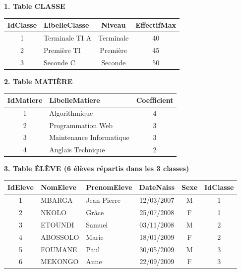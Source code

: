 \documentclass[11pt]{article}
\begin{document}
\begin{exemplebox}
\textbf{1. Table CLASSE}
\begin{center}
\begin{tabularx}{\linewidth}{|c|X|c|c|}\hline
\textbf{IdClasse} & \textbf{LibelleClasse} & \textbf{Niveau} & \textbf{EffectifMax} \\\hline
1 & Terminale TI A & Terminale & 40 \\\hline
2 & Première TI & Première & 45 \\\hline
3 & Seconde C & Seconde & 50 \\\hline
\end{tabularx}
\end{center}

\textbf{2. Table MATIÈRE}
\begin{center}
\begin{tabularx}{\linewidth}{|c|X|c|}\hline
\textbf{IdMatiere} & \textbf{LibelleMatiere} & \textbf{Coefficient} \\\hline
1 & Algorithmique & 4 \\\hline
2 & Programmation Web & 3 \\\hline
3 & Maintenance Informatique & 3 \\\hline
4 & Anglais Technique & 2 \\\hline
\end{tabularx}
\end{center}

\textbf{3. Table ÉLÈVE (6 élèves répartis dans les 3 classes)}
\begin{center}
\begin{tabularx}{\linewidth}{|c|X|X|c|c|c|}\hline
\textbf{IdEleve} & \textbf{NomEleve} & \textbf{PrenomEleve} & \textbf{DateNaiss} & \textbf{Sexe} & \textbf{IdClasse} \\\hline
1 & MBARGA & Jean-Pierre & 12/03/2007 & M & 1 \\\hline
2 & NKOLO & Grâce & 25/07/2008 & F & 1 \\\hline
3 & ETOUNDI & Samuel & 03/11/2008 & M & 2 \\\hline
4 & ABOSSOLO & Marie & 18/01/2009 & F & 2 \\\hline
5 & FOUMANE & Paul & 30/05/2009 & M & 3 \\\hline
6 & MEKONGO & Anne & 22/09/2009 & F & 3 \\\hline
\end{tabularx}
\end{center}


\end{exemplebox}
\end{document}
